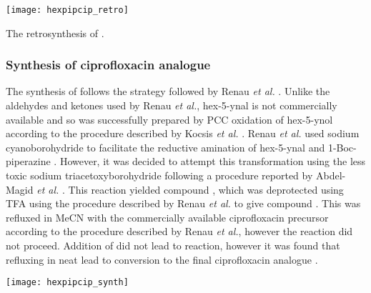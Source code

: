 \begin{scheme}[H]
	\begin{center}
		\texttt{[image: hexpipcip\_retro]}
		\caption{The retrosynthesis of . \label{sch:hexpipcip_retro}}
	\end{center}
\end{scheme}

\subsubsection{Synthesis of ciprofloxacin analogue }

The synthesis of  follows the strategy followed by Renau \textit{et al.} \cite{Renau1996}. Unlike the aldehydes and ketones used by Renau \textit{et al.}\cite{Renau1996}, hex-5-ynal  is not commercially available and so was successfully prepared by PCC oxidation of hex-5-ynol  according to the procedure described by Kocsis \textit{et al.} \cite{Kocsis2012}. Renau \textit{et al.}\cite{Renau1996} used sodium cyanoborohydride to facilitate the reductive amination of hex-5-ynal  and 1-Boc-piperazine . However, it was decided to attempt this transformation using the less toxic sodium triacetoxyborohydride following a procedure reported by Abdel-Magid \textit{et al.} \cite{Abdel-Magid1996}. This reaction yielded compound , which was deprotected using TFA using the procedure described by Renau \textit{et al.}\cite{Renau1996} to give compound . This was refluxed in MeCN with the commercially available ciprofloxacin precursor  according to the procedure described by Renau \textit{et al.}\cite{Renau1996}, however the reaction did not proceed. Addition of  did not lead to reaction, however it was found that refluxing in neat  lead to conversion to the final ciprofloxacin analogue .

\begin{scheme}[H]
	\begin{center}
		\texttt{[image: hexpipcip\_synth]}
		\caption{The synthesis of . 
		a) Pyridinium chlorochromate, , r.t., 5 h, 72 \%.
		b) , 1,2-dichloroethane, r.t., 10.5 h, 99 \%.
		c) TFA, r.t., 1 h, 100 \%.
		d) , reflux, 15 h, 21 \%. %
		\label{sch:hexpipcip_synth}}
	\end{center}
\end{scheme}


